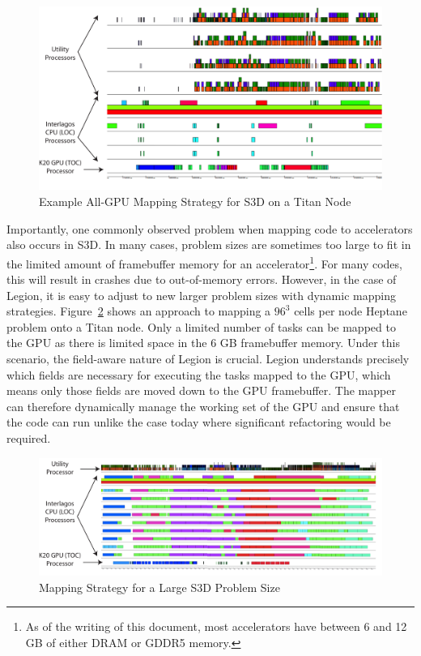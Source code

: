 \begin{figure}
\centering
\includegraphics[scale=0.7]{figs/AllGPUMapping.pdf}
\caption{Example All-GPU Mapping Strategy for S3D on a Titan Node\label{fig:allgpumap}}
\end{figure}

Importantly, one commonly observed problem when
mapping code to accelerators also occurs in S3D.
In many cases, problem sizes are sometimes too
large to fit in the limited amount of framebuffer
memory for an accelerator\footnote{As of the writing
of this document, most accelerators have between
6 and 12 GB of either DRAM or GDDR5 memory.}. For
many codes, this will result in crashes due to 
out-of-memory errors. However, in the case of
Legion, it is easy to adjust to new larger
problem sizes with dynamic mapping strategies.
Figure~\ref{fig:largemap} shows an approach to 
mapping a $96^3$ cells per node Heptane problem onto
a Titan node. Only a limited number of tasks can
be mapped to the GPU as there is limited space in
the 6 GB framebuffer memory. Under this scenario,
the field-aware nature of Legion is crucial. Legion
understands precisely which fields are necessary for
executing the tasks mapped to the GPU, which means
only those fields are moved down to the GPU 
framebuffer. The mapper can therefore dynamically 
manage the working set of the GPU and ensure that
the code can run unlike the case today where 
significant refactoring would be required.

\begin{figure}
\centering
\includegraphics[scale=0.7]{figs/LargeMapping.pdf}
\caption{Mapping Strategy for a Large S3D Problem Size\label{fig:largemap}}
\end{figure}

